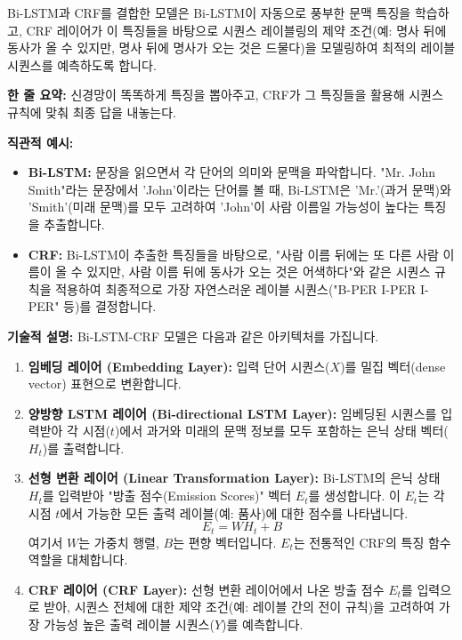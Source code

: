 \documentclass[11pt,a4paper]{article}
\theoremstyle{definition}
\begin{document}
Bi-LSTM과 CRF를 결합한 모델은 Bi-LSTM이 자동으로 풍부한 문맥 특징을 학습하고, CRF 레이어가 이 특징들을 바탕으로 시퀀스 레이블링의 제약 조건(예: 명사 뒤에 동사가 올 수 있지만, 명사 뒤에 명사가 오는 것은 드물다)을 모델링하여 최적의 레이블 시퀀스를 예측하도록 합니다.

\begin{tcolorbox}[conceptbox, title=Bi-LSTM-CRF의 핵심 아이디어]
\textbf{한 줄 요약:} 신경망이 똑똑하게 특징을 뽑아주고, CRF가 그 특징들을 활용해 시퀀스 규칙에 맞춰 최종 답을 내놓는다.

\textbf{직관적 예시:}
\begin{itemize}
    \item \textbf{Bi-LSTM:} 문장을 읽으면서 각 단어의 의미와 문맥을 파악합니다. "Mr. John Smith"라는 문장에서 'John'이라는 단어를 볼 때, Bi-LSTM은 'Mr.'(과거 문맥)와 'Smith'(미래 문맥)를 모두 고려하여 'John'이 사람 이름일 가능성이 높다는 특징을 추출합니다.
    \item \textbf{CRF:} Bi-LSTM이 추출한 특징들을 바탕으로, "사람 이름 뒤에는 또 다른 사람 이름이 올 수 있지만, 사람 이름 뒤에 동사가 오는 것은 어색하다"와 같은 시퀀스 규칙을 적용하여 최종적으로 가장 자연스러운 레이블 시퀀스("B-PER I-PER I-PER" 등)를 결정합니다.
\end{itemize}

\textbf{기술적 설명:} Bi-LSTM-CRF 모델은 다음과 같은 아키텍처를 가집니다.
\begin{enumerate}
    \item \textbf{임베딩 레이어 (Embedding Layer):} 입력 단어 시퀀스($X$)를 밀집 벡터(dense vector) 표현으로 변환합니다.
    \item \textbf{양방향 LSTM 레이어 (Bi-directional LSTM Layer):} 임베딩된 시퀀스를 입력받아 각 시점($t$)에서 과거와 미래의 문맥 정보를 모두 포함하는 은닉 상태 벡터($H_t$)를 출력합니다.
    \item \textbf{선형 변환 레이어 (Linear Transformation Layer):} Bi-LSTM의 은닉 상태 $H_t$를 입력받아 "방출 점수(Emission Scores)" 벡터 $E_t$를 생성합니다. 이 $E_t$는 각 시점 $t$에서 가능한 모든 출력 레이블(예: 품사)에 대한 점수를 나타냅니다.
    \[ E_t = W H_t + B \]
    여기서 $W$는 가중치 행렬, $B$는 편향 벡터입니다. $E_t$는 전통적인 CRF의 특징 함수 역할을 대체합니다.
    \item \textbf{CRF 레이어 (CRF Layer):} 선형 변환 레이어에서 나온 방출 점수 $E_t$를 입력으로 받아, 시퀀스 전체에 대한 제약 조건(예: 레이블 간의 전이 규칙)을 고려하여 가장 가능성 높은 출력 레이블 시퀀스($Y$)를 예측합니다.
\end{enumerate}
\end{tcolorbox}
\end{document}
